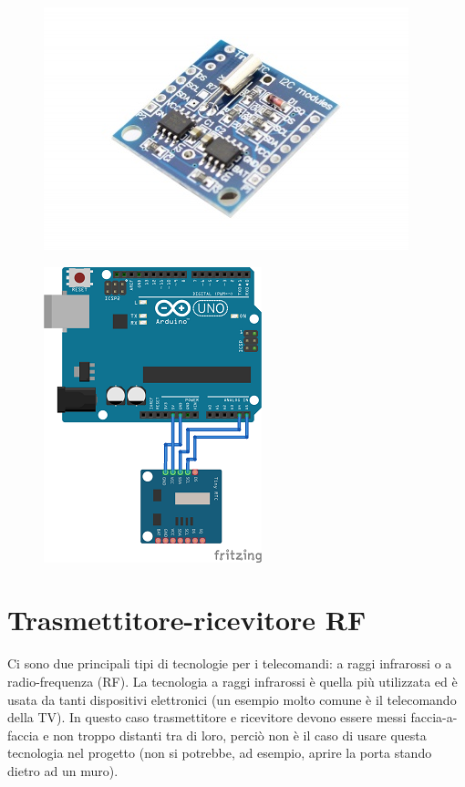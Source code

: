 \documentclass[12pt]{report}
\begin{document}
\begin{figure}[H]
	\centering
	\begin{minipage}{0.5\textwidth}
		\centering
		\includegraphics[width=0.5\linewidth]{./img/tinyRTC.jpg}
		\label{fig:tinyRTC}
	\end{minipage}%
	\begin{minipage}{0.5\textwidth}
		\centering
		\includegraphics[width=0.55\linewidth]{./img/tinyRTC_uno.png}
		\label{fig:tinyRTC_uno}
	\end{minipage}
\end{figure}

%
\section{Trasmettitore-ricevitore RF}
%

Ci sono due principali tipi di tecnologie per i telecomandi: a raggi infrarossi o a radio-frequenza (RF).
La tecnologia a raggi infrarossi è quella più utilizzata ed è usata da tanti dispositivi elettronici (un esempio molto comune è il telecomando della TV). In questo caso trasmettitore e ricevitore devono essere messi faccia-a-faccia e non troppo distanti tra di loro, perciò non è il caso di usare questa tecnologia nel progetto (non si potrebbe, ad esempio, aprire la porta stando dietro ad un muro).
\end{document}
